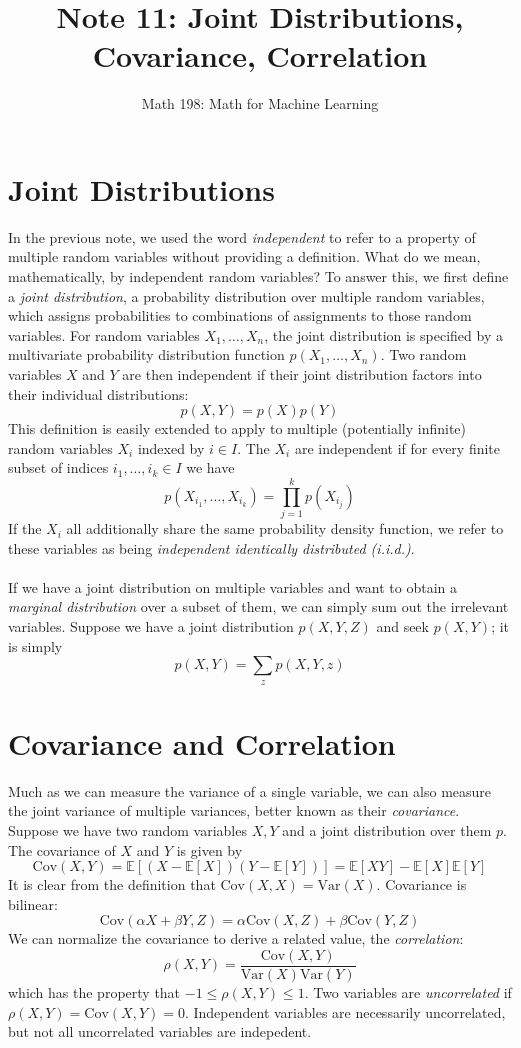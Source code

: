 \documentclass{article}
\title{Note 11: Joint Distributions, Covariance, Correlation}
\author{Math 198: Math for Machine Learning}
\date{}
\begin{document}
\maketitle

\section{Joint Distributions}
In the previous note, we used the word \textit{independent} to refer to a property of multiple random variables without providing a definition. What do we mean, mathematically, by independent random variables? To answer this, we first define a \textit{joint distribution}, a probability distribution over multiple random variables, which assigns probabilities to combinations of assignments to those random variables. For random variables $X_1, \hdots, X_n$, the joint distribution is specified by a multivariate probability distribution function $p(X_1, \hdots, X_n)$. Two random variables $X$ and $Y$ are then independent if their joint distribution factors into their individual distributions: $$p(X, Y) = p(X)p(Y)$$
This definition is easily extended to apply to multiple (potentially infinite) random variables $X_i$ indexed by $i \in I$. The $X_i$ are independent if for every finite subset of indices $i_1, \hdots, i_k \in I$ we have $$p(X_{i_1}, \hdots, X_{i_k}) = \prod_{j=1}^k p(X_{i_j})$$
If the $X_i$ all additionally share the same probability density function, we refer to these variables as being \textit{independent identically distributed (i.i.d.)}. \\\\
If we have a joint distribution on multiple variables and want to obtain a \textit{marginal distribution} over a subset of them, we can simply sum out the irrelevant variables. Suppose we have a joint distribution $p(X, Y, Z)$ and seek $p(X, Y)$; it is simply $$p(X, Y) = \sum_z p(X, Y, z)$$

\section{Covariance and Correlation}
Much as we can measure the variance of a single variable, we can also measure the joint variance of multiple variances, better known as their \textit{covariance}. Suppose we have two random variables $X, Y$ and a joint distribution over them $p$. The covariance of $X$ and $Y$ is given by $$\text{Cov}(X, Y) = \mathbb{E}[(X - \mathbb{E}[X])(Y - \mathbb{E}[Y])] = \mathbb{E}[XY] - \mathbb{E}[X]\mathbb{E}[Y]$$
It is clear from the definition that $\text{Cov}(X, X) = \text{Var}(X)$. Covariance is bilinear: $$\text{Cov}(\alpha X + \beta Y, Z) = \alpha\text{Cov}(X, Z) + \beta\text{Cov}(Y, Z)$$
We can normalize the covariance to derive a related value, the \textit{correlation}: $$\rho(X, Y) = \frac{\text{Cov}(X, Y)}{\text{Var}(X)\text{Var}(Y)}$$
which has the property that $-1 \leq \rho(X, Y) \leq 1$. Two variables are \textit{uncorrelated} if $\rho(X, Y) = \text{Cov}(X, Y) = 0$. Independent variables are necessarily uncorrelated, but not all uncorrelated variables are indepedent.
\end{document}
